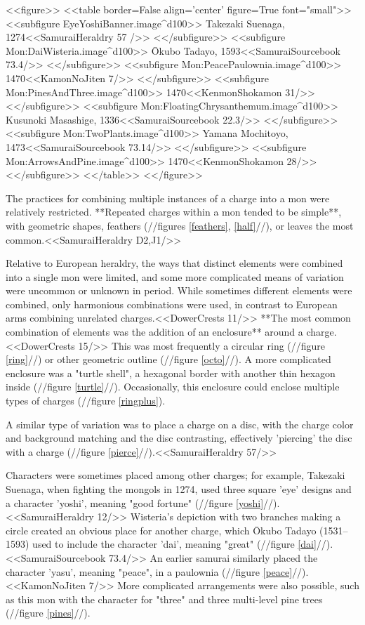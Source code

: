   <<figure>>
  <<table border=False align='center' figure=True font="small">>
  <<subfigure EyeYoshiBanner.image^d100>>
    \label{yoshi}Takezaki Suenaga, 1274<<SamuraiHeraldry 57 />>
  <</subfigure>>
  <<subfigure Mon:DaiWisteria.image^d100>>
    \label{dai}Ōkubo Tadayo, 1593<<SamuraiSourcebook 73.4/>>
  <</subfigure>>
  <<subfigure Mon:PeacePaulownia.image^d100>>
    \label{peace}1470<<KamonNoJiten 7/>>
  <</subfigure>>
  <<subfigure Mon:PinesAndThree.image^d100>>
    \label{pines}1470<<KenmonShokamon 31/>>
  <</subfigure>>
  <<subfigure Mon:FloatingChrysanthemum.image^d100>>
    \label{water}Kusunoki Masashige, 1336<<SamuraiSourcebook 22.3/>>
  <</subfigure>>
  <<subfigure Mon:TwoPlants.image^d100>>
    \label{twoplants}Yamana Mochitoyo, 1473<<SamuraiSourcebook 73.14/>>
  <</subfigure>>
  <<subfigure Mon:ArrowsAndPine.image^d100>>
    \label{arrowspine}1470<<KenmonShokamon 28/>>
  <</subfigure>>
  <</table>>
  <</figure>>

  The practices for combining multiple instances of a charge into a
  mon were relatively restricted.  **Repeated charges within a mon tended to be
  simple**, with geometric shapes, feathers (//figures \ref{feathers}, \ref{half}//), or leaves the most
  common.<<SamuraiHeraldry D2,J1/>>

  Relative to European heraldry, the ways that distinct elements were
  combined into a single mon were limited, and some more complicated
  means of variation were uncommon or unknown in period.
  While sometimes different elements were combined, only harmonious
  combinations were used, in contrast to European arms combining
  unrelated charges.<<DowerCrests 11/>> **The most common combination
  of elements was the addition of an enclosure** around a
  charge.<<DowerCrests 15/>>  This was most frequently a
  circular ring (//figure \ref{ring}//) or other geometric 
  outline (//figure \ref{octo}//).  
  A more complicated enclosure was a "turtle shell", a hexagonal border
  with another thin hexagon inside (//figure \ref{turtle}//).
  Occasionally, this enclosure could enclose
  multiple types of charges (//figure \ref{ringplus}).

  A similar type of variation was to place a charge on a disc, with
  the charge color and background matching and the disc contrasting,
  effectively 'piercing' the disc with a charge (//figure \ref{pierce}//).<<SamuraiHeraldry
  57/>>

  Characters were sometimes placed among other charges; for example,
  Takezaki Suenaga, when fighting the mongols in 1274, used three
  square 'eye' designs and a character 'yoshi', meaning "good
  fortune" (//figure \ref{yoshi}//).<<SamuraiHeraldry 12/>> Wisteria's depiction with two
  branches making a circle created an obvious place for another
  charge, which \=Okubo Tadayo (1531--1593) used to include the
  character 'dai', meaning "great" (//figure \ref{dai}//).<<SamuraiSourcebook 73.4/>>
  An earlier samurai similarly placed the character 'yasu', meaning "peace",
  in a paulownia (//figure \ref{peace}//).<<KamonNoJiten 7/>>
  More complicated arrangements were also possible,
  such as this mon with the character for "three" and
  three multi-level pine trees (//figure \ref{pines}//).
  
